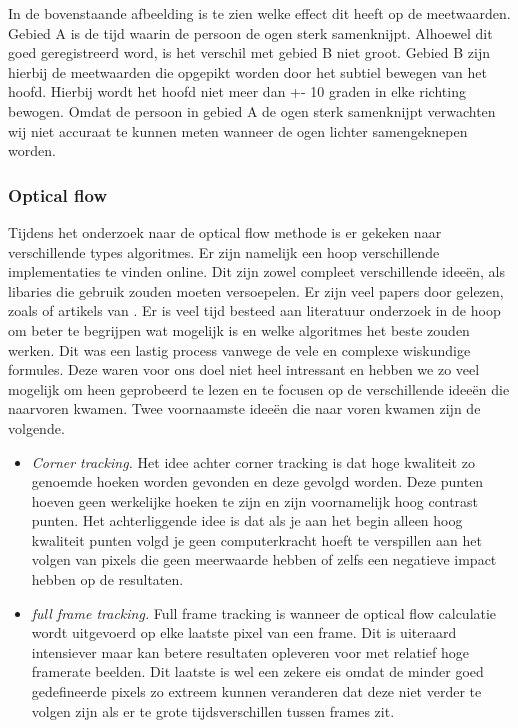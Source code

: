 \documentclass[11pt]{article}
\begin{document}
    \vspace{1em}
    In de bovenstaande afbeelding is te zien welke effect dit heeft op de meetwaarden.
    Gebied A is de tijd waarin de persoon de ogen sterk samenknijpt. Alhoewel dit goed geregistreerd word, is het verschil met gebied B niet groot.
    Gebied B zijn hierbij de meetwaarden die opgepikt worden door het subtiel bewegen van het hoofd. Hierbij wordt het hoofd niet meer
    dan +- 10 graden in elke richting bewogen. Omdat de persoon in gebied A de ogen sterk samenknijpt verwachten wij niet accuraat te kunnen meten
    wanneer de ogen lichter samengeknepen worden.


    \subsubsection{Optical flow}
    Tijdens het onderzoek naar de optical flow methode is er gekeken naar verschillende types algoritmes. 
    Er zijn namelijk een hoop verschillende implementaties te vinden online. 
    Dit zijn zowel compleet verschillende ideeën, als libaries die gebruik zouden moeten versoepelen.
    Er zijn veel papers door gelezen, zoals \emph{\citet{naghsh2006efficient}} of artikels van \emph{\citet{Readinglist}}. 
    Er is veel tijd besteed aan literatuur onderzoek in de hoop om beter te begrijpen wat mogelijk is en welke algoritmes het beste zouden werken.
    Dit was een lastig process vanwege de vele en complexe wiskundige formules. 
    Deze waren voor ons doel niet heel intressant en hebben we zo veel mogelijk om heen geprobeerd te lezen en te focusen op de verschillende ideeën die naarvoren kwamen.
    Twee voornaamste ideeën die naar voren kwamen zijn de volgende.
    \begin{itemize}
        \item \emph{Corner tracking.} Het idee achter corner tracking is dat hoge kwaliteit zo genoemde hoeken worden gevonden en deze gevolgd worden. 
        Deze punten hoeven geen werkelijke hoeken te zijn en zijn voornamelijk hoog contrast punten. 
        Het achterliggende idee is dat als je aan het begin alleen hoog kwaliteit punten volgd je geen computerkracht hoeft te verspillen 
        aan het volgen van pixels die geen meerwaarde hebben of zelfs een negatieve impact hebben op de resultaten.
        \item \emph{full frame tracking.} 
        Full frame tracking is wanneer de optical flow calculatie wordt uitgevoerd op elke laatste pixel van een frame. 
        Dit is uiteraard intensiever maar kan betere resultaten opleveren voor met relatief hoge framerate beelden. 
        Dit laatste is wel een zekere eis omdat de minder goed gedefineerde pixels zo extreem kunnen veranderen dat deze 
        niet verder te volgen zijn als er te grote tijdsverschillen tussen frames zit.    
    \end{itemize}
\end{document}
